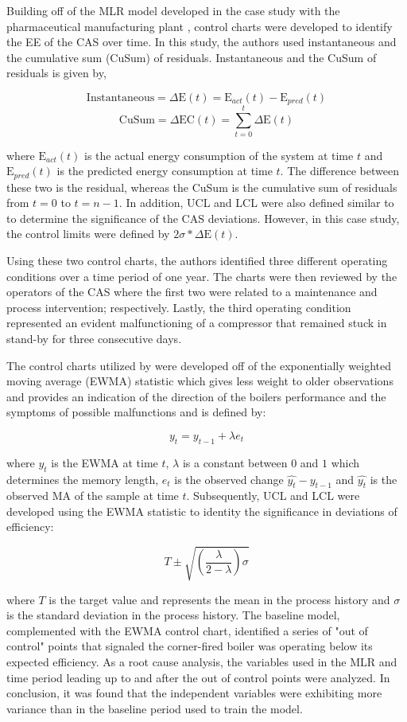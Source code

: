 Building off of the MLR model developed in the case study with the pharmaceutical manufacturing plant \cite{cas}, control charts were developed to identify the EE of the CAS over time. In this study, the authors used instantaneous and the cumulative sum (CuSum) of residuals. Instantaneous and the CuSum of residuals is given by,

$$\text{Instantaneous} = \Delta \text{E}(t) = \text{E}_{act}(t) - \text{E}_{pred}(t)$$
$$\text{CuSum} = \Delta \text{EC}(t) = \sum_{t=0}^t\Delta \text{E}(t)$$

where $\text{E}_{act}(t)$ is the actual energy consumption of the system at time $t$ and $\text{E}_{pred}(t)$ is the predicted energy consumption at time $t$. The difference between these two is the residual, whereas the CuSum is the cumulative sum of residuals from $t=0$ to $t=n-1$. In addition, UCL and LCL were also defined similar to \cite{tightening} to determine the significance of the CAS deviations. However, in this case study, the control limits were defined by $2 \sigma * \Delta \text{E}(t)$. 

Using these two control charts, the authors identified three different operating conditions over a time period of one year. The charts were then reviewed by the operators of the CAS where the first two were related to a maintenance and process intervention; respectively. Lastly, the third operating condition represented an evident malfunctioning of a compressor that remained stuck in stand-by for three consecutive days.


The control charts utilized by \cite{boiler} were developed off of the exponentially weighted moving average (EWMA) statistic which gives less weight to older observations and provides an indication of the direction of the boilers performance and the symptoms of possible malfunctions and is defined by:

$$y_t = y_{t-1} + \lambda e_t$$

where $y_t$ is the EWMA at time $t$, $\lambda$ is a constant between $0$ and $1$ which determines the memory length, $e_t$ is the observed change $\hat{y_t} - y_{t-1}$ and $\hat{y_t}$ is the observed MA of the sample at time $t$. Subsequently, UCL and LCL were developed using the EWMA statistic to identity the significance in deviations of efficiency:

$$T \pm \sqrt{(\frac{\lambda}{2 - \lambda})\sigma}$$

where $T$ is the target value and represents the mean in the process history and $\sigma$ is the standard deviation in the process history. The baseline model, complemented with the EWMA control chart, identified a series of "out of control" points that signaled the corner-fired boiler was operating below its expected efficiency. As a root cause analysis, the variables used in the MLR and time period leading up to and after the out of control points were analyzed. In conclusion, it was found that the independent variables were exhibiting more variance than in the baseline period used to train the model.